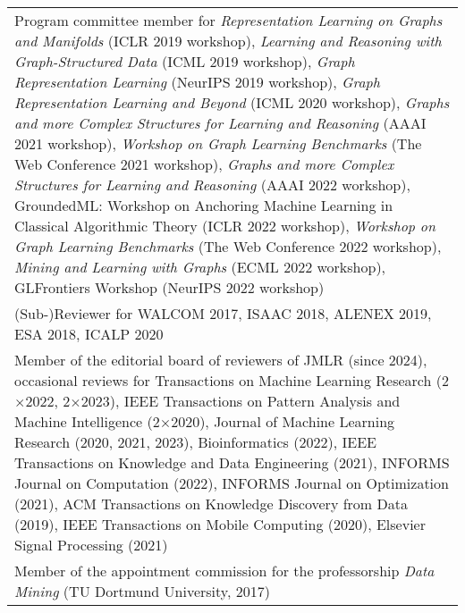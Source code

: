 \documentclass[11pt, a4paper, DIV=14, headings=small]{scrartcl}
\begin{document}
\begin{longtabu}{p{14.5cm}}
		Program committee member for \emph{Representation Learning on Graphs and Manifolds} (ICLR 2019 workshop), \emph{Learning and Reasoning with Graph-Structured Data} (ICML 2019 workshop), \emph{Graph Representation Learning} (NeurIPS 2019 workshop), \emph{Graph Representation Learning and Beyond} (ICML 2020 workshop), \emph{Graphs and more Complex Structures for Learning and Reasoning} (AAAI 2021 workshop), \emph{Workshop on Graph Learning Benchmarks} (The Web Conference 2021 workshop),  \emph{Graphs and more Complex Structures for Learning and Reasoning} (AAAI 2022 workshop), GroundedML: Workshop on Anchoring Machine Learning in Classical Algorithmic Theory (ICLR 2022 workshop), \emph{Workshop on Graph Learning Benchmarks} (The Web Conference 2022 workshop), \emph{Mining and Learning with Graphs} (ECML 2022 workshop), GLFrontiers Workshop (NeurIPS 2022 workshop) \\
		
		
		(Sub-)Reviewer for WALCOM 2017, ISAAC 2018, ALENEX 2019, ESA 2018, ICALP 2020                                                                                                                                                                                                                                                                                                                                                                                                                                                                                                                                                                                                                                                                                                                                                                                                                 \\
		
		Member of the editorial board of reviewers of JMLR (since 2024), occasional reviews for Transactions on Machine Learning Research (2$\times$2022, 2$\times$2023), IEEE Transactions on Pattern Analysis and Machine Intelligence (2$\times$2020), Journal of Machine Learning Research (2020, 2021, 2023), Bioinformatics (2022), IEEE Transactions on Knowledge and Data Engineering (2021), INFORMS Journal on Computation (2022), INFORMS Journal on Optimization (2021), ACM Transactions on Knowledge Discovery from Data (2019), IEEE Transactions on Mobile Computing (2020), Elsevier Signal Processing (2021)                                                                                                                                                                                                                                                                                                                                                                         \\
		
		Member of the appointment commission for the professorship \emph{Data Mining} (TU Dortmund University, 2017)
	\end{longtabu}
\end{document}
